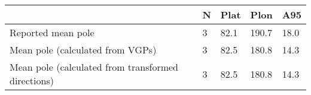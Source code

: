 \begin{tabular}{lllll}
\toprule
{} &  N &  Plat &   Plon &   A95 \\
\midrule
Reported mean pole                                 &  3 &  82.1 &  190.7 &  18.0 \\
Mean pole (calculated from VGPs)                   &  3 &  82.5 &  180.8 &  14.3 \\
Mean pole (calculated from transformed directions) &  3 &  82.5 &  180.8 &  14.3 \\
\bottomrule
\end{tabular}
